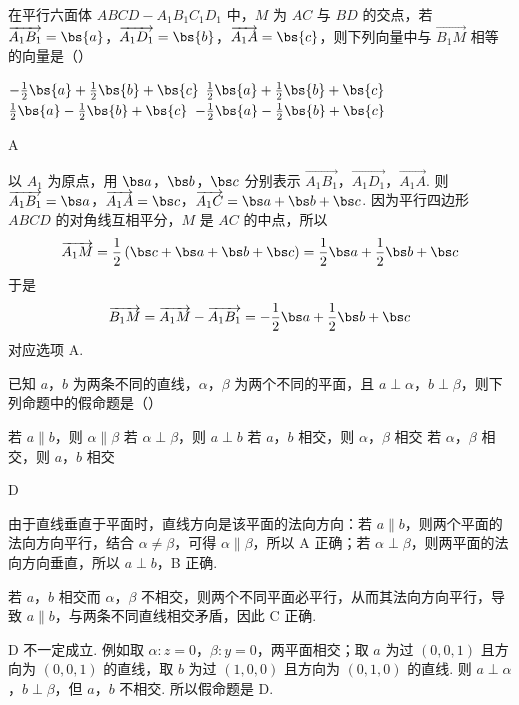 \begin{problem}
在平行六面体 \(ABCD-A_1B_1C_1D_1\) 中，\(M\) 为 \(AC\) 与 \(BD\) 的交点，若 \(\overrightarrow{A_1B_1}=\bs{a}\)，\(\overrightarrow{A_1D_1}=\bs{b}\)，\(\overrightarrow{A_1A}=\bs{c}\)，则下列向量中与 \(\overrightarrow{B_1M}\) 相等的向量是（\quad）

\choices
    {\(-\frac{1}{2}\bs{a}+\frac{1}{2}\bs{b}+\bs{c}\)}
    {\(\frac{1}{2}\bs{a}+\frac{1}{2}\bs{b}+\bs{c}\)}
    {\(\frac{1}{2}\bs{a}-\frac{1}{2}\bs{b}+\bs{c}\)}
    {\(-\frac{1}{2}\bs{a}-\frac{1}{2}\bs{b}+\bs{c}\)}
\end{problem}

\begin{answer}
A
\end{answer}

\begin{solution}
以 \(A_1\) 为原点，用 \(\bs a\)，\(\bs b\)，\(\bs c\) 分别表示 \(\overrightarrow{A_1B_1}\)，\(\overrightarrow{A_1D_1}\)，\(\overrightarrow{A_1A}\). 则
\(\overrightarrow{A_1B_1}=\bs a\)，\(\overrightarrow{A_1A}=\bs c\)，\(\overrightarrow{A_1C}=\bs a+\bs b+\bs c\).
因为平行四边形 \(ABCD\) 的对角线互相平分，\(M\) 是 \(AC\) 的中点，所以
\[
\overrightarrow{A_1M}=\frac12\left(\bs c+\bs a+\bs b+\bs c\right)=\frac12\bs a+\frac12\bs b+\bs c
\]
于是
\[
\overrightarrow{B_1M}=\overrightarrow{A_1M}-\overrightarrow{A_1B_1}
=-\frac12\bs a+\frac12\bs b+\bs c
\]
对应选项 A.
\end{solution}

\begin{problem}
已知 \(a\)，\(b\) 为两条不同的直线，\(\alpha\)，\(\beta\) 为两个不同的平面，且 \(a\perp\alpha\)，\(b\perp\beta\)，则下列命题中的假命题是（\quad）

\choices
    {若 \(a\parallel b\)，则 \(\alpha\parallel\beta\)}
    {若 \(\alpha\perp\beta\)，则 \(a\perp b\)}
    {若 \(a\)，\(b\) 相交，则 \(\alpha\)，\(\beta\) 相交}
    {若 \(\alpha\)，\(\beta\) 相交，则 \(a\)，\(b\) 相交}
\end{problem}

\begin{answer}
D
\end{answer}

\begin{solution}
由于直线垂直于平面时，直线方向是该平面的法向方向：若 \(a\parallel b\)，则两个平面的法向方向平行，结合 \(\alpha\ne\beta\)，可得 \(\alpha\parallel\beta\)，所以 A 正确；若 \(\alpha\perp\beta\)，则两平面的法向方向垂直，所以 \(a\perp b\)，B 正确.

若 \(a\)，\(b\) 相交而 \(\alpha\)，\(\beta\) 不相交，则两个不同平面必平行，从而其法向方向平行，导致 \(a\parallel b\)，与两条不同直线相交矛盾，因此 C 正确.

D 不一定成立. 例如取 \(\alpha:z=0\)，\(\beta:y=0\)，两平面相交；取 \(a\) 为过 \((0,0,1)\) 且方向为 \((0,0,1)\) 的直线，取 \(b\) 为过 \((1,0,0)\) 且方向为 \((0,1,0)\) 的直线. 则 \(a\perp\alpha\)，\(b\perp\beta\)，但 \(a\)，\(b\) 不相交. 所以假命题是 D.
\end{solution}

